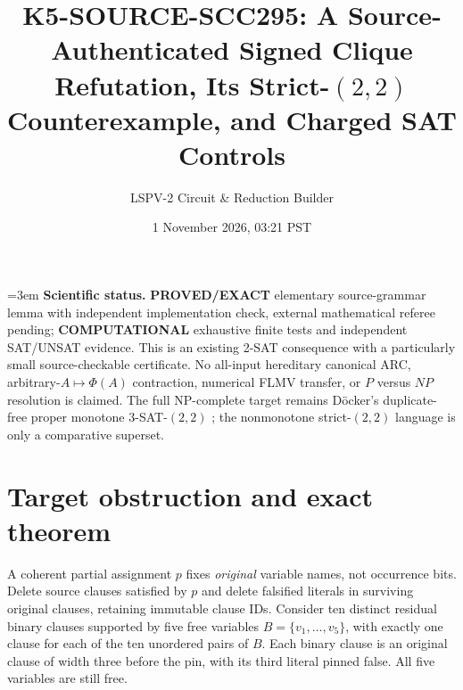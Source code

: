 \documentclass[11pt]{article}
\title{K5-SOURCE-SCC295: A Source-Authenticated Signed Clique Refutation, Its Strict-$(2,2)$ Counterexample, and Charged SAT Controls}
\author{LSPV-2 Circuit \& Reduction Builder}
\date{1 November 2026, 03:21 PST}
\begin{document}
\maketitle\emergencystretch=3em
\noindent\textbf{Scientific status.} \textbf{PROVED/EXACT} elementary source-grammar lemma with independent implementation check, external mathematical referee pending; \textbf{COMPUTATIONAL} exhaustive finite tests and independent SAT/UNSAT evidence. This is an existing 2-SAT consequence with a particularly small source-checkable certificate. No all-input hereditary canonical ARC, arbitrary-$A\mapsto\Phi(A)$ contraction, numerical FLMV transfer, or $P$ versus $NP$ resolution is claimed. The full NP-complete target remains D\"ocker's duplicate-free proper monotone 3-SAT-$(2,2)$ \cite{doecker2019}; the nonmonotone strict-$(2,2)$ language is only a comparative superset.

\section{Target obstruction and exact theorem}
A coherent partial assignment $p$ fixes \emph{original} variable names, not occurrence bits. Delete source clauses satisfied by $p$ and delete falsified literals in surviving original clauses, retaining immutable clause IDs. Consider ten distinct residual binary clauses supported by five free variables $B=\{v_1,\ldots,v_5\}$, with exactly one clause for each of the ten unordered pairs of $B$. Each binary clause is an original clause of width three before the pin, with its third literal pinned false. All five variables are still free.
\end{document}
